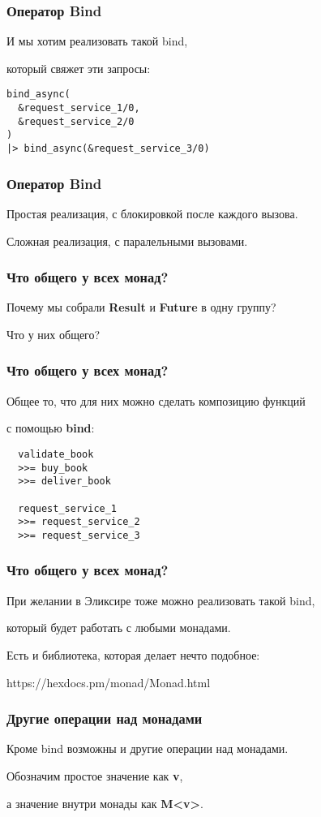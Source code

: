 \documentclass[10pt]{beamer}
\begin{document}
\begin{frame}[fragile]
  \frametitle{Оператор Bind}
  И мы хотим реализовать такой bind,
  \par \bigskip
  который свяжет эти запросы:
  \par \bigskip
  \begin{lstlisting}
bind_async(
  &request_service_1/0, 
  &request_service_2/0
)
|> bind_async(&request_service_3/0)
  \end{lstlisting}
\end{frame}

\begin{frame}
  \frametitle{Оператор Bind}
  Простая реализация, с блокировкой после каждого вызова.
  \par \bigskip
  Сложная реализация, с паралельными вызовами.
\end{frame}

\begin{frame}
  \frametitle{Что общего у всех монад?}
  Почему мы собрали \textbf{Result} и \textbf{Future} в одну группу?
  \par \bigskip
  Что у них общего?
\end{frame}

\begin{frame}[fragile]
  \frametitle{Что общего у всех монад?}
  Общее то, что для них можно сделать композицию функций
  \par \bigskip
  с помощью \textbf{bind}:
  \par \bigskip
  \begin{lstlisting}
  validate_book
  >>= buy_book
  >>= deliver_book

  request_service_1
  >>= request_service_2
  >>= request_service_3
  \end{lstlisting}
\end{frame}

\begin{frame}
  \frametitle{Что общего у всех монад?}
  При желании в Эликсире тоже можно реализовать такой bind,
  \par \bigskip
  который будет работать с любыми монадами.
  \par \bigskip
  Есть и библиотека, которая делает нечто подобное:
  \par \bigskip
  \textcolor{DeepSkyBlue3}{https://hexdocs.pm/monad/Monad.html}
\end{frame}

\begin{frame}
  \frametitle{Другие операции над монадами}
  Кроме bind возможны и другие операции над монадами.
  \par \bigskip
  Обозначим простое значение как \textbf{v},
  \par \bigskip
  а значение внутри монады как \textbf{M<v>}.
\end{frame}
\end{document}
